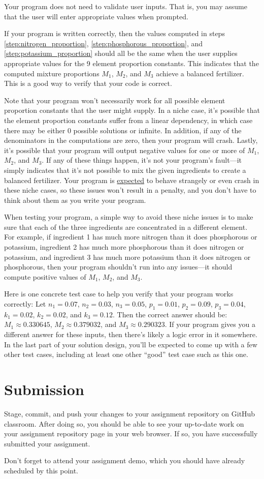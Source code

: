 \documentclass{article}
\begin{document}
Your program does not need to validate user inputs. That is, you may assume that the user will enter appropriate values when prompted.

If your program is written correctly, then the values computed in steps \ref{step:nitrogen_proportion}, \ref{step:phosphorous_proportion}, and \ref{step:potassium_proportion} should all be the same when the user supplies appropriate values for the 9 element proportion constants. This indicates that the computed mixture proportions $M_1$, $M_2$, and $M_3$ achieve a balanced fertilizer. This is a good way to verify that your code is correct.

Note that your program won't necessarily work for all possible element proportion constants that the user might supply. In a niche case, it's possible that the element proportion constants suffer from a linear dependency, in which case there may be either 0 possible solutions or infinite. In addition, if any of the denominators in the computations are zero, then your program will crash. Lastly, it's possible that your program will output negative values for one or more of $M_1$, $M_2$, and $M_3$. If any of these things happen, it's not your program's fault---it simply indicates that it's not possible to mix the given ingredients to create a balanced fertilizer. Your program is \ul{expected} to behave strangely or even crash in these niche cases, so these issues won't result in a penalty, and you don't have to think about them as you write your program.

When testing your program, a simple way to avoid these niche issues is to make sure that each of the three ingredients are concentrated in a different element. For example, if ingredient 1 has much more nitrogen than it does phosphorous or potassium, ingredient 2 has much more phosphorous than it does nitrogen or potassium, and ingredient 3 has much more potassium than it does nitrogen or phosphorous, then your program shouldn't run into any issues---it should compute positive values of $M_1$, $M_2$, and $M_3$.

Here is one concrete test case to help you verify that your program works correctly: Let $n_1=0.07$, $n_2=0.03$, $n_3=0.05$, $p_1=0.01$, $p_2=0.09$, $p_3=0.04$, $k_1=0.02$, $k_2=0.02$, and $k_3=0.12$. Then the correct answer should be: $M_1 \approx 0.330645$, $M_2 \approx 0.379032$, and $M_3 \approx 0.290323$. If your program gives you a different answer for these inputs, then there's likely a logic error in it somewhere. In the last part of your solution design, you'll be expected to come up with a few other test cases, including at least one other ``good'' test case such as this one.

\section{Submission}

Stage, commit, and push your changes to your assignment repository on GitHub classroom. After doing so, you should be able to see your up-to-date work on your assignment repository page in your web browser. If so, you have successfully submitted your assignment.

Don't forget to attend your assignment demo, which you should have already scheduled by this point.
\end{document}
